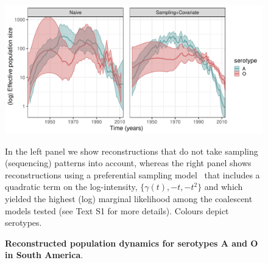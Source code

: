 \documentclass[10pt]{article}
\begin{document}
\begin{figure}[!ht]
\begin{center}
\includegraphics[scale=0.54]{FIGURES/PLOTS/population_size_reconstructions_full.pdf}
\end{center}
\caption{\textbf{Reconstructed population dynamics for serotypes A and O in South America}.
}
In the left panel we show reconstructions that do not take sampling (sequencing) patterns into account, whereas the right panel shows reconstructions using a preferential sampling model~\citep{Karcher2020} that includes a quadratic term on the log-intensity, $\{\gamma(t), -t, -t^2\}$ and which yielded the highest (log) marginal likelihood among the coalescent models tested (see Text S1 for more details).
Colours depict serotypes.

\label{fig:popdyn}
\end{figure}
\end{document}
